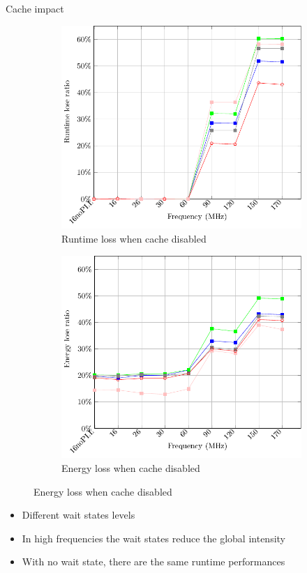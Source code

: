 \documentclass[
	11pt, %
]{beamer}
\begin{document}
\begin{frame}{Cache impact}
	\begin{figure}
		\begin{subfigure}{0.4\textwidth}
			\includegraphics[scale = 0.35]{data/stm32g_v2/cache_impact/duration.pdf}
			\caption{Runtime loss when cache disabled}
		\end{subfigure}
		\begin{subfigure}{0.4\textwidth}
			\includegraphics[scale = 0.35]{data/stm32g_v2/cache_impact/energy.pdf}
			\caption{Energy loss when cache disabled}
		\end{subfigure}
	\end{figure}
	\begin{itemize}
		\item Different wait states levels
		\item In high frequencies the wait states reduce the global intensity
		\item With no wait state, there are the same runtime performances 
	\end{itemize}
\end{frame}
\end{document}
